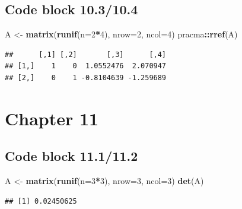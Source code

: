 \documentclass[
]{book}
\newenvironment{Shaded}{\begin{snugshade}}{\end{snugshade}}
\newcommand{\DataTypeTok}[1]{\textcolor[rgb]{0.13,0.29,0.53}{#1}}
\newcommand{\DecValTok}[1]{\textcolor[rgb]{0.00,0.00,0.81}{#1}}
\newcommand{\KeywordTok}[1]{\textcolor[rgb]{0.13,0.29,0.53}{\textbf{#1}}}
\newcommand{\NormalTok}[1]{#1}
\newcommand{\OperatorTok}[1]{\textcolor[rgb]{0.81,0.36,0.00}{\textbf{#1}}}
\newcommand{\StringTok}[1]{\textcolor[rgb]{0.31,0.60,0.02}{#1}}
\begin{document}
\hypertarget{code-block-10.310.4}{%
\subsection*{Code block 10.3/10.4}\label{code-block-10.310.4}}

\begin{Shaded}
\begin{Highlighting}[]
\NormalTok{A \textless{}{-}}\StringTok{ }\KeywordTok{matrix}\NormalTok{(}\KeywordTok{runif}\NormalTok{(}\DataTypeTok{n=}\DecValTok{2}\OperatorTok{*}\DecValTok{4}\NormalTok{), }\DataTypeTok{nrow=}\DecValTok{2}\NormalTok{, }\DataTypeTok{ncol=}\DecValTok{4}\NormalTok{)}
\NormalTok{pracma}\OperatorTok{::}\KeywordTok{rref}\NormalTok{(A)}
\end{Highlighting}
\end{Shaded}

\begin{verbatim}
##      [,1] [,2]       [,3]      [,4]
## [1,]    1    0  1.0552476  2.070947
## [2,]    0    1 -0.8104639 -1.259689
\end{verbatim}

\hypertarget{chapter-11}{%
\section*{Chapter 11}\label{chapter-11}}

\hypertarget{code-block-11.111.2}{%
\subsection*{Code block 11.1/11.2}\label{code-block-11.111.2}}

\begin{Shaded}
\begin{Highlighting}[]
\NormalTok{A \textless{}{-}}\StringTok{ }\KeywordTok{matrix}\NormalTok{(}\KeywordTok{runif}\NormalTok{(}\DataTypeTok{n=}\DecValTok{3}\OperatorTok{*}\DecValTok{3}\NormalTok{), }\DataTypeTok{nrow=}\DecValTok{3}\NormalTok{, }\DataTypeTok{ncol=}\DecValTok{3}\NormalTok{)}
\KeywordTok{det}\NormalTok{(A)}
\end{Highlighting}
\end{Shaded}

\begin{verbatim}
## [1] 0.02450625
\end{verbatim}
\end{document}
